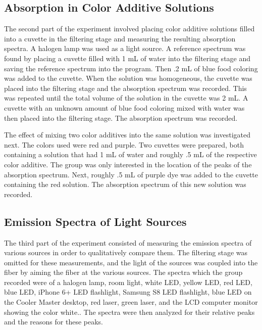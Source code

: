 \documentclass{article}
\begin{document}
\subsection{Absorption in Color Additive Solutions}
The second part of the experiment involved placing color additive solutions filled into a cuvette in the filtering stage and measuring the resulting absorption spectra. A halogen lamp was used as a light source. A reference spectrum was found by placing a cuvette filled with 1 mL of water into the filtering stage and saving the reference spectrum into the program. Then .2 mL of blue food coloring was added to the cuvette. When the solution was homogeneous, the cuvette was placed into the filtering stage and the absorption spectrum was recorded. This was repeated until the total volume of the solution in the cuvette was 2 mL. A cuvette with an unknown amount of blue food coloring mixed with water was then placed into the filtering stage. The absorption spectrum was recorded. 

The effect of mixing two color additives into the same solution was investigated next. The colors used were red and purple. Two cuvettes were prepared, both containing a solution that had 1 mL of water and roughly .5 mL of the respective color additive. The group was only interested in the location of the peaks of the absorption spectrum. Next, roughly .5 mL of purple dye was added to the cuvette containing the red solution. The absorption spectrum of this new solution was recorded.

\subsection{Emission Spectra of Light Sources}
The third part of the experiment consisted of measuring the emission spectra of various sources in order to qualitatively compare them. The filtering stage was omitted for these measurements, and the light of the sources was coupled into the fiber by aiming the fiber at the various sources. The spectra which the group recorded were of a halogen lamp, room light, white LED, yellow LED, red LED, blue LED, iPhone 6+ LED flashlight, Samsung S8 LED flashlight, blue LED on the Cooler Master desktop,  red laser, green laser, and the LCD computer monitor showing the color white.. The spectra were then analyzed for their relative peaks and the reasons for these peaks.
\end{document}
